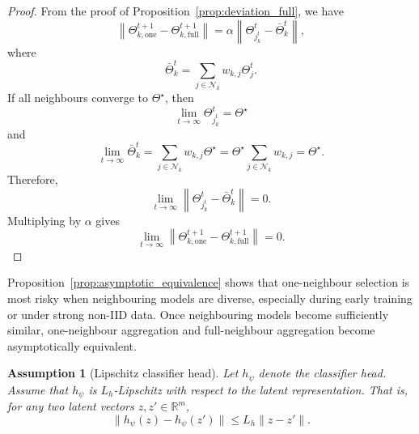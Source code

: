 \documentclass[conference]{IEEEtran}
\newtheorem{assumption}{Assumption}
\begin{document}
\begin{proof}
From the proof of Proposition~\ref{prop:deviation_full}, we have
\begin{equation}
\left\|
\Theta_{k,\mathrm{one}}^{t+1}
-
\Theta_{k,\mathrm{full}}^{t+1}
\right\|
=
\alpha
\left\|
\Theta_{j_k^t}^t-\bar{\Theta}_k^t
\right\|,
    \label{eq:auto-069}
\end{equation}
where
\begin{equation}
\bar{\Theta}_k^t
=
\sum_{j\in\mathcal{N}_k}w_{k,j}\Theta_j^t.
    \label{eq:auto-070}
\end{equation}
If all neighbours converge to $\Theta^\star$, then
\begin{equation}
\lim_{t\rightarrow\infty}\Theta_{j_k^t}^t=\Theta^\star
    \label{eq:auto-071}
\end{equation}
and
\begin{equation}
\lim_{t\rightarrow\infty}\bar{\Theta}_k^t
=
\sum_{j\in\mathcal{N}_k}w_{k,j}\Theta^\star
=
\Theta^\star
\sum_{j\in\mathcal{N}_k}w_{k,j}
=
\Theta^\star.
    \label{eq:auto-072}
\end{equation}
Therefore,
\begin{equation}
\lim_{t\rightarrow\infty}
\left\|
\Theta_{j_k^t}^t-\bar{\Theta}_k^t
\right\|
=
0.
    \label{eq:auto-073}
\end{equation}
Multiplying by $\alpha$ gives
\begin{equation}
\lim_{t\rightarrow\infty}
\left\|
\Theta_{k,\mathrm{one}}^{t+1}
-
\Theta_{k,\mathrm{full}}^{t+1}
\right\|
=
0.
    \label{eq:auto-074}
\end{equation}
\end{proof}

Proposition~\ref{prop:asymptotic_equivalence} shows that one-neighbour selection is most risky when neighbouring models are diverse, especially during early training or under strong non-IID data. Once neighbouring models become sufficiently similar, one-neighbour aggregation and full-neighbour aggregation become asymptotically equivalent.

\begin{assumption}[Lipschitz classifier head]
\label{ass:lipschitz_classifier}
Let $h_{\psi}$ denote the classifier head. Assume that $h_{\psi}$ is $L_h$-Lipschitz with respect to the latent representation. That is, for any two latent vectors $z,z'\in\mathbb{R}^m$,
\begin{equation}
\|h_{\psi}(z)-h_{\psi}(z')\|
\leq
L_h\|z-z'\|.
    \label{eq:auto-075}
\end{equation}
\end{assumption}
\end{document}
